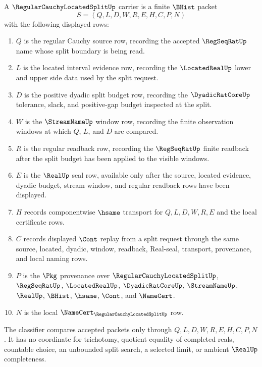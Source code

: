 \begin{definition}
\label{def:regular-cauchy-located-split-carrier}
A $\RegularCauchyLocatedSplitUp$ carrier is a finite $\BHist$ packet
$$
S=(Q,L,D,W,R,E,H,C,P,N)
$$
with the following displayed rows:
\begin{enumerate}
\item $Q$ is the regular Cauchy source row, recording the accepted $\RegSeqRatUp$ name whose split boundary is being read.
\item $L$ is the located interval evidence row, recording the $\LocatedRealUp$ lower and upper side data used by the split request.
\item $D$ is the positive dyadic split budget row, recording the $\DyadicRatCoreUp$ tolerance, slack, and positive-gap budget inspected at the split.
\item $W$ is the $\StreamNameUp$ window row, recording the finite observation windows at which $Q$, $L$, and $D$ are compared.
\item $R$ is the regular readback row, recording the $\RegSeqRatUp$ finite readback after the split budget has been applied to the visible windows.
\item $E$ is the $\RealUp$ seal row, available only after the source, located evidence, dyadic budget, stream window, and regular readback rows have been displayed.
\item $H$ records componentwise $\hsame$ transport for $Q,L,D,W,R,E$ and the local certificate rows.
\item $C$ records displayed $\Cont$ replay from a split request through the same source, located, dyadic, window, readback, Real-seal, transport, provenance, and local naming rows.
\item $P$ is the $\Pkg$ provenance over $\RegularCauchyLocatedSplitUp$, $\RegSeqRatUp$, $\LocatedRealUp$, $\DyadicRatCoreUp$, $\StreamNameUp$, $\RealUp$, $\BHist$, $\hsame$, $\Cont$, and $\NameCert$.
\item $N$ is the local $\NameCert_{\RegularCauchyLocatedSplitUp}$ row.
\end{enumerate}
The classifier compares accepted packets only through $Q,L,D,W,R,E,H,C,P,N$. It has no coordinate for trichotomy, quotient equality of completed reals, countable choice, an unbounded split search, a selected limit, or ambient $\RealUp$ completeness.
\end{definition}

